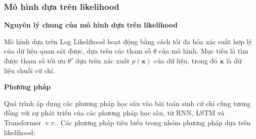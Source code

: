 \subsubsection{Mô hình dựa trên likelihood}

\textbf{Nguyên lý chung của mô hình dựa trên likelihood}

Mô hình dựa trên Log Likelihood hoạt động bằng cách tối đa hóa xác suất hợp lý của dữ liệu quan sát được, dựa trên các tham số $\theta$ của mô hình. Mục tiêu là tìm được tham số tối ưu $\theta'$ dựa trên xác xuất $p(\mathbf{x})$ của dữ liệu, trong đó $\mathbf{x}$ là dữ liệu chuỗi cử chỉ.



\textbf{Phương pháp}

Quá trình áp dụng các phương pháp học sâu vào bài toán sinh cử chỉ cũng tương đồng với sự phát triển của các phương pháp học sâu, từ RNN, LSTM và Transformer .v.v.. Các phương pháp tiêu biểu trong nhóm phương pháp dựa trên likelihood:

